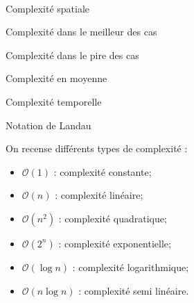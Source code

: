 \documentclass[10pt,fleqn]{article} %
\begin{document}

\vspace{2cm}
\pagestyle{fancy}
\thispagestyle{plain}


\begin{defi}
~\\
Complexité spatiale

\noindent Complexité dans le meilleur des cas

\noindent Complexité dans le pire des cas

\noindent Complexité en moyenne
\end{defi}

\begin{defi}
Complexité temporelle
\end{defi}

\begin{defi}
Notation de Landau
\end{defi}

\begin{exemple}
On recense différents types de complexité :
\begin{itemize}[label=,font=\color{ocre}] 
\item $\mathcal{O}(1)$ : complexité constante;
\item $\mathcal{O}(n)$ : complexité linéaire;
\item $\mathcal{O}(n^2)$ : complexité quadratique;
\item $\mathcal{O}(2^n)$ : complexité exponentielle;
\item $\mathcal{O}(\log n)$ : complexité logarithmique;
\item $\mathcal{O}(n \log n)$ : complexité semi linéaire.
\end{itemize}
\end{exemple}
\end{document}
